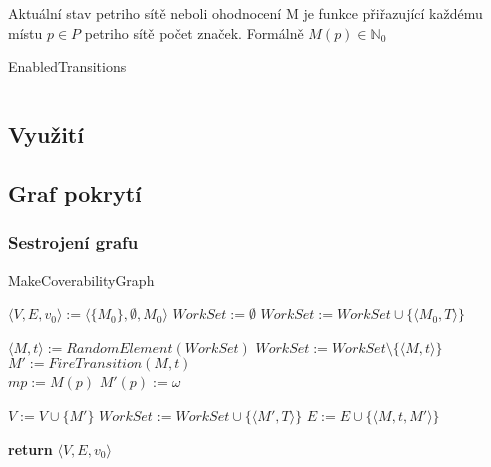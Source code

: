 \documentclass[
  biblatex,
  glossaries,
  index
]{kidiplom}
\begin{document}
Aktuální stav petriho sítě neboli ohodnocení M je funkce přiřazující každému
 místu $p \in P$ petriho sítě počet značek. Formálně $M(p) \in \mathbb{N}_0$

\begin{algorithm}
  \caption{EnabledTransitions}
  \begin{algorithmic}[1]
      \State $ $
    \EndFunction
  \end{algorithmic}      
\end{algorithm}      

\subsection{Využití}

\subsection{Graf pokrytí}

\subsubsection{Sestrojení grafu}


\begin{algorithm}
 \caption{MakeCoverabilityGraph}
 \begin{algorithmic}[1]
    \State $\langle V,E,v_0\rangle := \langle\{M_0\},\emptyset,M_0\rangle$
    \State $WorkSet := \emptyset $
      \State $WorkSet := WorkSet \cup \{\langle M_0, T \rangle\} $
    \EndFor

      \State $\langle M, t \rangle := RandomElement(WorkSet)$
      \State $WorkSet := WorkSet \setminus \{\langle M, t \rangle\}$
      \State $M' := FireTransition(M,t)$
        \\ 
          \State $mp := M(p)$
            \State $M'(p) := \omega$
          \EndIf
        \EndFor
      \EndFor

        \State $V := V \cup \{M'\}$
          \State $WorkSet := WorkSet \cup \{\langle M', T \rangle\} $
        \EndFor
      \EndIf
      \State $E := E \cup \{\langle M,t,M'\rangle\}$
    \EndWhile

    \State \textbf{return} $\langle V,E,v_0\rangle$
  \EndFunction
 \end{algorithmic}
\end{algorithm}
\end{document}
